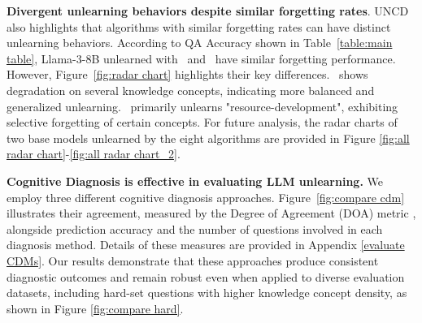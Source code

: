     
    

\noindent
\textbf{Divergent unlearning behaviors despite similar forgetting rates}.
UNCD also highlights that algorithms with similar forgetting rates can have distinct unlearning behaviors. According to QA Accuracy shown in Table~\ref{table:main table}, Llama-3-8B unlearned with \GAKL\ and \NPOKL\ have similar forgetting performance. However, Figure~\ref{fig:radar chart} highlights their key differences. \NPOKL\ shows degradation on several knowledge concepts, indicating more balanced and generalized unlearning. \GAKL\ primarily unlearns "resource-development", exhibiting selective forgetting of certain concepts. For future analysis, the radar charts of two base models unlearned by the eight algorithms are provided in Figure \ref{fig:all radar chart}-\ref{fig:all radar chart_2}.



\textbf{Cognitive Diagnosis is effective in evaluating LLM unlearning.} We employ three different   cognitive diagnosis approaches. Figure~\ref{fig:compare cdm} illustrates their agreement, measured  by the Degree of Agreement (DOA) metric \citep{fouss2007random}, alongside prediction accuracy and the number of questions involved in each diagnosis method. Details of  these measures are provided in Appendix \ref{evaluate CDMs}. Our results demonstrate that these approaches produce consistent diagnostic outcomes and remain robust even when applied to diverse evaluation datasets, including hard-set questions with higher knowledge concept density, as shown in  Figure \ref{fig:compare hard}. 

